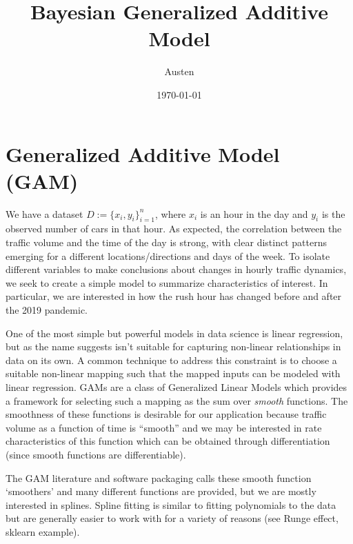 \documentclass{article}
\title{Bayesian Generalized Additive Model}
\author{Austen}
\date{\today}
\begin{document}
\maketitle

\section{Generalized Additive Model (GAM)}

We have a dataset $D := \{x_i, y_i\}_{i=1}^n$, where $x_i$ is an hour in the day and $y_i$ is the observed number of cars in that hour. As expected, the correlation between the traffic volume and the time of the day is strong, with clear distinct patterns emerging for a different locations/directions and days of the week. To isolate different variables to make conclusions about changes in hourly traffic dynamics, we seek to create a simple model to summarize characteristics of interest. In particular, we are interested in how the rush hour has changed before and after the 2019 pandemic.

One of the most simple but powerful models in data science is linear regression, but as the name suggests isn't suitable for capturing non-linear relationships in data on its own. A common technique to address this constraint is to choose a suitable non-linear mapping such that the mapped inputs can be modeled with linear regression. GAMs are a class of Generalized Linear Models which provides a framework for selecting such a mapping as the sum over \emph{smooth} functions. The smoothness of these functions is desirable for our application because traffic volume as a function of time is ``smooth'' and we may be interested in rate characteristics of this function which can be obtained through differentiation (since smooth functions are differentiable). 

The GAM literature and software packaging calls these smooth function `smoothers' and many different functions are provided, but we are mostly interested in splines. Spline fitting is similar to fitting polynomials to the data but are generally easier to work with for a variety of reasons (see Runge effect, sklearn example). 
\end{document}
